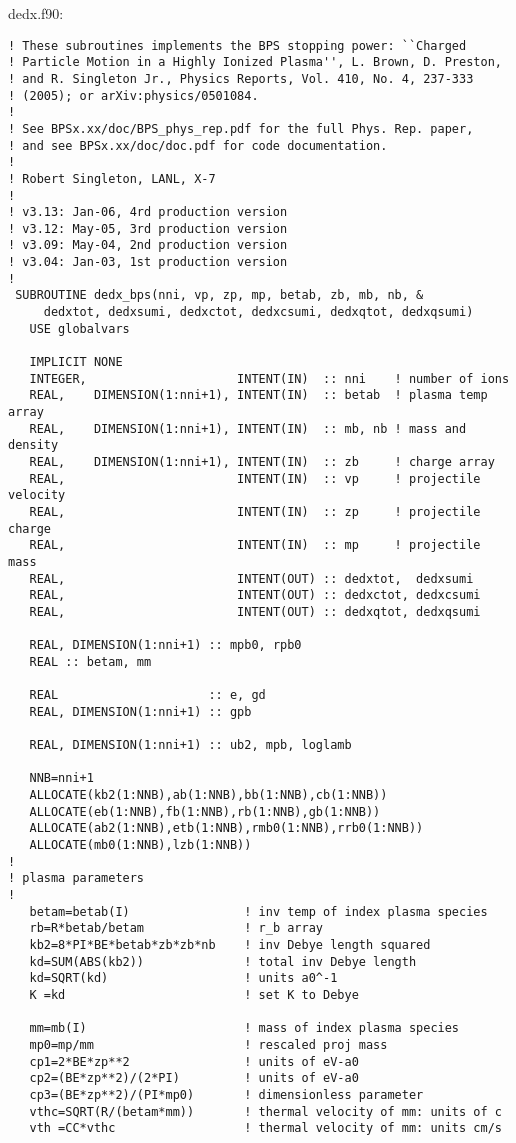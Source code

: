 \documentclass[preprint,12pt,eqsecnum,nofootinbib,amsmath,amssymb]{revtex4}
\begin{document}
\vskip1cm
{
\noindent
dedx.f90:
\baselineskip12pt
\begin{verbatim}
! These subroutines implements the BPS stopping power: ``Charged 
! Particle Motion in a Highly Ionized Plasma'', L. Brown, D. Preston, 
! and R. Singleton Jr., Physics Reports, Vol. 410, No. 4, 237-333 
! (2005); or arXiv:physics/0501084.
! 
! See BPSx.xx/doc/BPS_phys_rep.pdf for the full Phys. Rep. paper,
! and see BPSx.xx/doc/doc.pdf for code documentation.
!
! Robert Singleton, LANL, X-7
!
! v3.13: Jan-06, 4rd production version
! v3.12: May-05, 3rd production version
! v3.09: May-04, 2nd production version
! v3.04: Jan-03, 1st production version
!
 SUBROUTINE dedx_bps(nni, vp, zp, mp, betab, zb, mb, nb, &
     dedxtot, dedxsumi, dedxctot, dedxcsumi, dedxqtot, dedxqsumi)
   USE globalvars

   IMPLICIT NONE
   INTEGER,                     INTENT(IN)  :: nni    ! number of ions
   REAL,    DIMENSION(1:nni+1), INTENT(IN)  :: betab  ! plasma temp array
   REAL,    DIMENSION(1:nni+1), INTENT(IN)  :: mb, nb ! mass and density
   REAL,    DIMENSION(1:nni+1), INTENT(IN)  :: zb     ! charge array
   REAL,                        INTENT(IN)  :: vp     ! projectile velocity
   REAL,                        INTENT(IN)  :: zp     ! projectile charge
   REAL,                        INTENT(IN)  :: mp     ! projectile mass
   REAL,                        INTENT(OUT) :: dedxtot,  dedxsumi
   REAL,                        INTENT(OUT) :: dedxctot, dedxcsumi
   REAL,                        INTENT(OUT) :: dedxqtot, dedxqsumi

   REAL, DIMENSION(1:nni+1) :: mpb0, rpb0
   REAL :: betam, mm

   REAL                     :: e, gd
   REAL, DIMENSION(1:nni+1) :: gpb

   REAL, DIMENSION(1:nni+1) :: ub2, mpb, loglamb

   NNB=nni+1
   ALLOCATE(kb2(1:NNB),ab(1:NNB),bb(1:NNB),cb(1:NNB))
   ALLOCATE(eb(1:NNB),fb(1:NNB),rb(1:NNB),gb(1:NNB))
   ALLOCATE(ab2(1:NNB),etb(1:NNB),rmb0(1:NNB),rrb0(1:NNB))
   ALLOCATE(mb0(1:NNB),lzb(1:NNB))
!
! plasma parameters
!
   betam=betab(I)                ! inv temp of index plasma species
   rb=R*betab/betam              ! r_b array
   kb2=8*PI*BE*betab*zb*zb*nb    ! inv Debye length squared
   kd=SUM(ABS(kb2))              ! total inv Debye length
   kd=SQRT(kd)                   ! units a0^-1
   K =kd                         ! set K to Debye 

   mm=mb(I)                      ! mass of index plasma species  
   mp0=mp/mm                     ! rescaled proj mass
   cp1=2*BE*zp**2                ! units of eV-a0 
   cp2=(BE*zp**2)/(2*PI)         ! units of eV-a0 
   cp3=(BE*zp**2)/(PI*mp0)       ! dimensionless parameter   
   vthc=SQRT(R/(betam*mm))       ! thermal velocity of mm: units of c
   vth =CC*vthc                  ! thermal velocity of mm: units cm/s 


\end{verbatim}}
\end{document}
